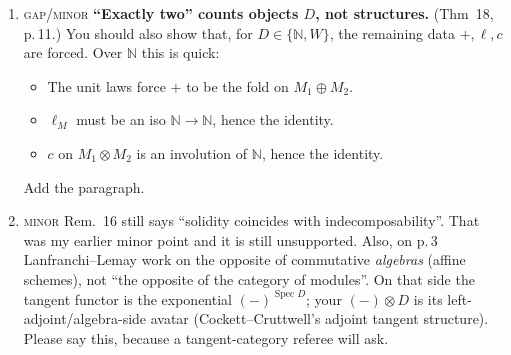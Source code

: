 \documentclass[11pt]{article}
\newcommand{\N}{\mathbb{N}}
\newcommand{\iss}[1]{\textsc{#1}}
\begin{document}
\begin{enumerate}[label=\textbf{U\arabic*.},leftmargin=*]
\item \iss{gap/minor} \textbf{``Exactly two'' counts objects $D$, not structures.} (Thm~18, p.\,11.)
You should also show that, for $D\in\{\N,W\}$, the remaining data $+,\ell,c$ are forced. Over $\N$
this is quick:
\begin{itemize}[leftmargin=1.2em]
\item The unit laws force $+$ to be the fold on $M_1\oplus M_2$.
\item $\ell_M$ must be an iso $\N\to\N$, hence the identity.
\item $c$ on $M_1\otimes M_2$ is an involution of $\N$, hence the identity.
\end{itemize}
Add the paragraph.

\item \iss{minor} Rem.~16 still says ``solidity coincides with indecomposability''. That was my
earlier minor point and it is still unsupported. Also, on p.\,3 Lanfranchi--Lemay work on the
opposite of commutative \emph{algebras} (affine schemes), not ``the opposite of the category of
modules''. On that side the tangent functor is the exponential $(-)^{\operatorname{Spec}D}$; your
$(-)\otimes D$ is its left-adjoint/algebra-side avatar (Cockett--Cruttwell's adjoint tangent
structure). Please say this, because a tangent-category referee will ask.


\end{enumerate}
\end{document}
